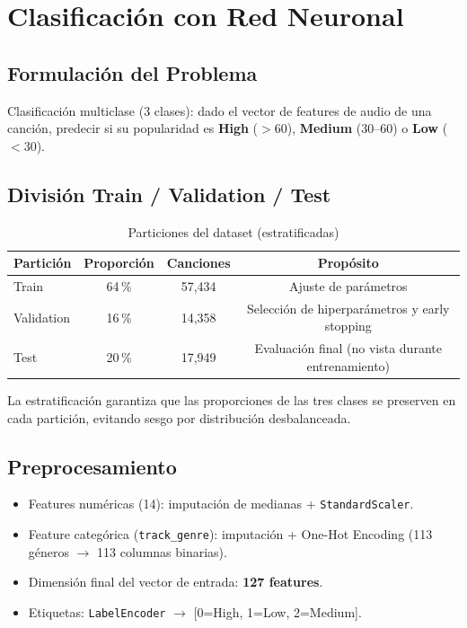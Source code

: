 \documentclass[12pt,a4paper]{article}
\begin{document}
\section{Clasificaci\'on con Red Neuronal}

\subsection{Formulaci\'on del Problema}

Clasificaci\'on multiclase (3 clases): dado el vector de features de audio de una canci\'on,
predecir si su popularidad es \textbf{High} ($>60$), \textbf{Medium} (30--60) o
\textbf{Low} ($<30$).

\subsection{Divisi\'on Train / Validation / Test}

\begin{table}[H]
\centering
\caption{Particiones del dataset (estratificadas)}
\begin{tabular}{lccc}
\toprule
\textbf{Partici\'on} & \textbf{Proporci\'on} & \textbf{Canciones} &
  \textbf{Prop\'osito} \\
\midrule
Train      & 64\,\% & 57{,}434 & Ajuste de par\'ametros \\
Validation & 16\,\% & 14{,}358 & Selecci\'on de hiperpar\'ametros y early stopping \\
Test       & 20\,\% & 17{,}949 & Evaluaci\'on final (no vista durante entrenamiento) \\
\bottomrule
\end{tabular}
\end{table}

La estratificaci\'on garantiza que las proporciones de las tres clases se preserven en
cada partici\'on, evitando sesgo por distribuci\'on desbalanceada.

\subsection{Preprocesamiento}

\begin{itemize}[noitemsep]
  \item Features num\'ericas (14): imputaci\'on de medianas + \texttt{StandardScaler}.
  \item Feature categ\'orica (\texttt{track\_genre}): imputaci\'on + One-Hot Encoding
    (113 g\'eneros $\rightarrow$ 113 columnas binarias).
  \item Dimensi\'on final del vector de entrada: \textbf{127 features}.
  \item Etiquetas: \texttt{LabelEncoder} $\rightarrow$ [0=High, 1=Low, 2=Medium].
\end{itemize}
\end{document}
